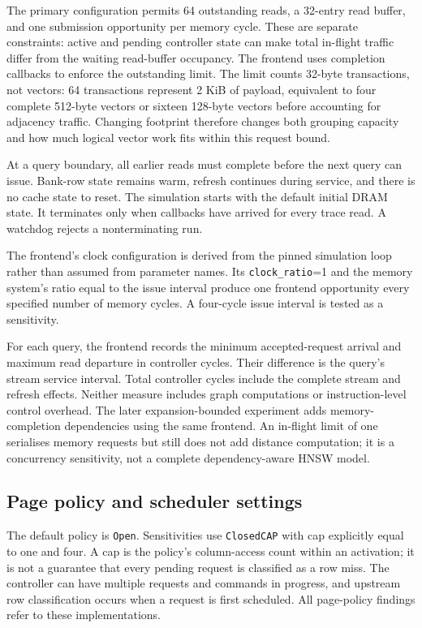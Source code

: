 \documentclass[11pt,a4paper]{report}
\begin{document}
The primary configuration permits 64 outstanding reads, a 32-entry read buffer, and one submission opportunity per memory cycle. These are separate constraints: active and pending controller state can make total in-flight traffic differ from the waiting read-buffer occupancy. The frontend uses completion callbacks to enforce the outstanding limit. The limit counts 32-byte transactions, not vectors: 64 transactions represent 2 KiB of payload, equivalent to four complete 512-byte vectors or sixteen 128-byte vectors before accounting for adjacency traffic. Changing footprint therefore changes both grouping capacity and how much logical vector work fits within this request bound.

At a query boundary, all earlier reads must complete before the next query can issue. Bank-row state remains warm, refresh continues during service, and there is no cache state to reset. The simulation starts with the default initial DRAM state. It terminates only when callbacks have arrived for every trace read. A watchdog rejects a nonterminating run.

The frontend's clock configuration is derived from the pinned simulation loop rather than assumed from parameter names. Its \texttt{clock\_ratio}=1 and the memory system's ratio equal to the issue interval produce one frontend opportunity every specified number of memory cycles. A four-cycle issue interval is tested as a sensitivity.

For each query, the frontend records the minimum accepted-request arrival and maximum read departure in controller cycles. Their difference is the query's stream service interval. Total controller cycles include the complete stream and refresh effects. Neither measure includes graph computations or instruction-level control overhead. The later expansion-bounded experiment adds memory-completion dependencies using the same frontend. An in-flight limit of one serialises memory requests but still does not add distance computation; it is a concurrency sensitivity, not a complete dependency-aware HNSW model.

\subsection{Page policy and scheduler settings}
The default policy is \texttt{Open}. Sensitivities use \texttt{ClosedCAP} with cap explicitly equal to one and four. A cap is the policy's column-access count within an activation; it is not a guarantee that every pending request is classified as a row miss. The controller can have multiple requests and commands in progress, and upstream row classification occurs when a request is first scheduled. All page-policy findings refer to these implementations.
\end{document}

